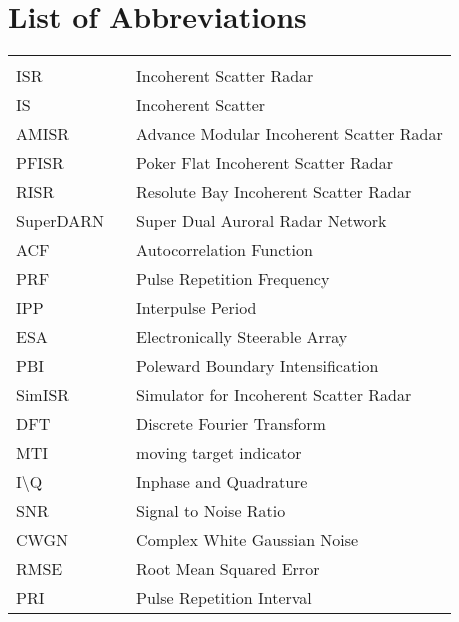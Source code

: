 \chapter*{List of Abbreviations}
\begin{center}
  \begin{tabular}{lll}
    \hspace*{2em} & \hspace*{1in} & \hspace*{4.5in} \\
    ISR  & \dotfill & Incoherent Scatter Radar \\
    IS & \dotfill & Incoherent Scatter\\
    AMISR  & \dotfill & Advance Modular Incoherent Scatter Radar \\
    PFISR & \dotfill & Poker Flat Incoherent Scatter Radar\\
    RISR & \dotfill & Resolute Bay Incoherent Scatter Radar\\
    SuperDARN & \dotfill & Super Dual Auroral Radar Network\\
    ACF & \dotfill & Autocorrelation Function\\
    PRF & \dotfill & Pulse Repetition Frequency \\
    IPP & \dotfill & Interpulse Period\\
    ESA  & \dotfill & Electronically Steerable Array \\
    PBI & \dotfill & Poleward Boundary Intensification \\
    SimISR & \dotfill & Simulator for Incoherent Scatter Radar \\
    DFT & \dotfill & Discrete Fourier Transform \\
    MTI & \dotfill & moving target indicator \\
    I\textbackslash Q & \dotfill & Inphase and Quadrature\\
    SNR & \dotfill & Signal to Noise Ratio\\
    CWGN & \dotfill & Complex White Gaussian Noise\\
    RMSE & \dotfill & Root Mean Squared Error\\
    PRI & \dotfill & Pulse Repetition Interval

 
  \end{tabular}
\end{center}
\cleardoublepage


\newpage
\endofprelim
